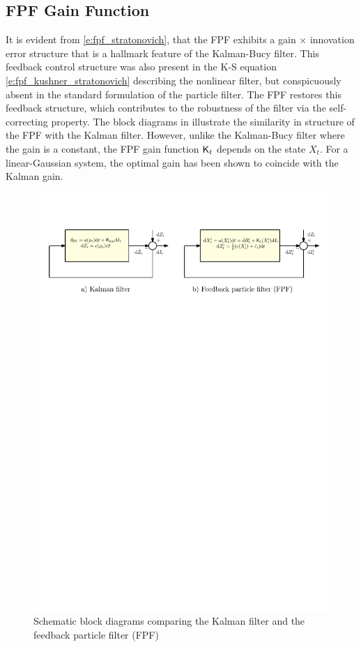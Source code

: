 \subsection{FPF Gain Function}
\label{s:fpf_gain}
It is evident from \eqref{e:fpf_stratonovich}, that the FPF exhibits a gain $\times$ innovation error structure that is a hallmark feature of the Kalman-Bucy filter. This feedback control structure was also present in the K-S equation \eqref{e:fpf_kushner_stratonovich} describing the nonlinear filter, but conspicuously absent in the standard formulation of the particle filter. The FPF restores this feedback structure, which contributes to the robustness of the filter via the self-correcting property.  The block diagrams in  illustrate the similarity in structure of the FPF with the Kalman filter. However, unlike the Kalman-Bucy filter where the gain is a constant, the FPF gain function $\text{\sf K}_t$ depends on the state $X_t$. For a linear-Gaussian system, the optimal gain has been shown to coincide with the Kalman gain. 
\begin{figure}
	\centering
		\includegraphics[width = 7in]{images/Chap4_FPF_Kalman}
		\caption{Schematic block diagrams comparing the Kalman filter and the feedback particle filter (FPF) \cite{yanmehmey13}}
		\label{fig:fpf_kalman}
\end{figure}

